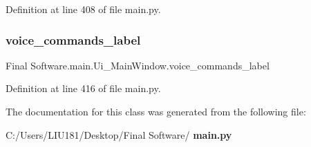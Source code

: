 Definition at line 408 of file main.\+py.

\mbox{\label{class_final_01_software_1_1main_1_1_ui___main_window_a5724752d0b9ed3299bf85b8e23e129d7}} 
\subsubsection{voice\_commands\_label}
{\footnotesize\ttfamily Final Software.\+main.\+Ui\+\_\+\+Main\+Window.\+voice\+\_\+commands\+\_\+label}



Definition at line 416 of file main.\+py.



The documentation for this class was generated from the following file\+:\begin{DoxyCompactItemize}
\item 
C\+:/\+Users/\+L\+I\+U181/\+Desktop/\+Final Software/\textbf{ main.\+py}\end{DoxyCompactItemize}
